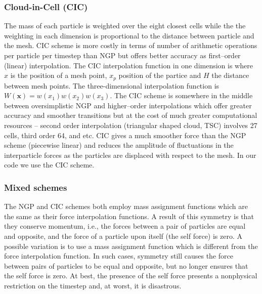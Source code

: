 \subsubsection{Cloud-in-Cell (CIC)}
The mass of each particle is weighted over the eight closest cells while the the weighting in each dimension is proportional to the distance between particle and the mesh. CIC scheme is more costly in terms of number of arithmetic operations per particle per timestep than NGP but offers better accuracy as first--order (linear) interpolation. The CIC interpolation function in one dimension is
where $x$ is the position of a mesh point, $x_p$ position of the partice and $H$ the distance between mesh points. The three-dimensional interpolation function is \(W(\mathbf x)=w(x_1)w(x_2)w(x_3)\). The CIC scheme is somewhere in the middle between oversimplistic NGP and higher--order interpolations which offer greater accuracy and smoother transitions but at the cost of much greater computational resources -- second order interpolation (triangular shaped cloud, TSC) involves 27 cells, third order 64, and etc. CIC gives a much smoother force than the NGP scheme (piecewise linear) and reduces the amplitude of fluctuations in the interparticle forces as the particles are displaced with respect to the mesh. In our code we use the CIC scheme.
\subsubsection{Mixed schemes}
The NGP and CIC schemes both employ mass assignment functions which are the same as their force interpolation functions. A result of this symmetry is that they conserve momentum, i.e., the forces between a pair of particles are equal and opposite, and the force of a particle upon itself (the self force) is zero. A possible variation is to use a mass assignment function which is different from the force interpolation function. In such cases, symmetry still causes the force between pairs of particles to be equal and opposite, but no longer ensures that the self force is zero. At best, the presence of the self force presents a nonphysical restriction on the timestep and, at worst, it is disastrous.


